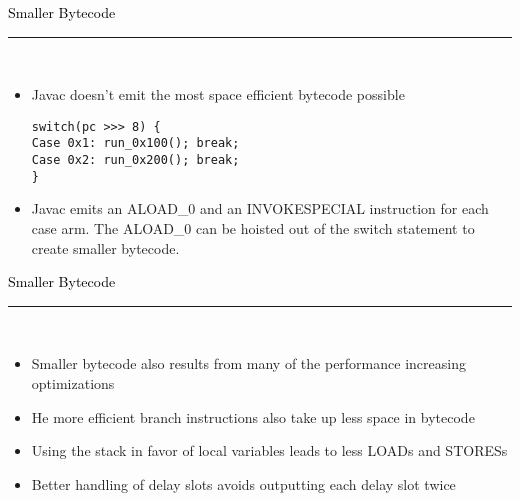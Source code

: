 \documentclass[letter]{seminar}
\begin{document}
\begin{slide}\raggedright
\renewcommand{\leftmargini}{5mm}
{\Large{\textcolor{black}{Smaller Bytecode}}}
\\\rule{\textwidth}{0.1pt}\\

\begin{itemize}


\item
     Javac doesn't emit the most space efficient bytecode possible


\vspace{5mm}



\begin{Verbatim}[fontsize=\tiny,frame=single,rulecolor=\color{CodeBorder},resetmargins=true,gobble=0]
switch(pc >>> 8) {
Case 0x1: run_0x100(); break;
Case 0x2: run_0x200(); break;
}
\end{Verbatim}



\item
     Javac emits an ALOAD\_0 and an INVOKESPECIAL instruction for each case arm. 
      The ALOAD\_0 can be hoisted out of the switch statement to create smaller bytecode.



\end{itemize}


\end{slide}


\begin{slide}\raggedright
\renewcommand{\leftmargini}{5mm}
{\Large{\textcolor{black}{Smaller Bytecode}}}
\\\rule{\textwidth}{0.1pt}\\

\begin{itemize}


\item
     Smaller bytecode also results from many of the performance 
      increasing optimizations

\item
     He more efficient branch instructions also take up less space in bytecode

\item
     Using the stack in favor of local variables leads to less LOADs and 
      STORESs

\item
     Better handling of delay slots avoids outputting each delay slot twice


\end{itemize}


\end{slide}
\end{document}
